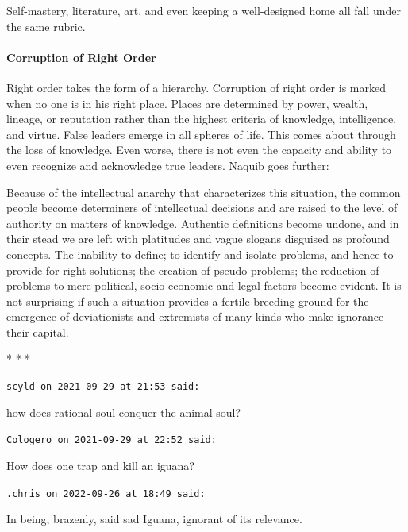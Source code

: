 Self-mastery, literature, art, and even keeping a well-designed home all fall under the same rubric.

\paragraph{Corruption of Right Order}


Right order takes the form of a hierarchy. Corruption of right order is marked when no one is in his right place. Places are determined by power, wealth, lineage, or reputation rather than the highest criteria of knowledge, intelligence, and virtue. False leaders emerge in all spheres of life. This comes about through the loss of knowledge. Even worse, there is not even the capacity and ability to even recognize and acknowledge true leaders. Naquib goes further:

\begin{quotex}
Because of the intellectual anarchy that characterizes this situation, the common people become determiners of intellectual decisions and are raised to the level of authority on matters of knowledge. Authentic definitions become undone, and in their stead we are left with platitudes and vague slogans disguised as profound concepts. The inability to define; to identify and isolate problems, and hence to provide for right solutions; the creation of pseudo-problems; the reduction of problems to mere political, socio-economic and legal factors become evident. It is not surprising if such a situation provides a fertile breeding ground for the emergence of deviationists and extremists of many kinds who make ignorance their capital.
\end{quotex}




\begin{center}* * *\end{center}

\begin{footnotesize}
\begin{sffamily}
\texttt{scyld on 2021-09-29 at 21:53 said:}

how does rational soul conquer the animal soul?

\hfill

\texttt{Cologero on 2021-09-29 at 22:52 said:}

How does one trap and kill an iguana?

\hfill

\texttt{.chris on 2022-09-26 at 18:49 said:}

In being, brazenly, said sad Iguana, ignorant of its relevance.


\hfill

\end{sffamily}
\end{footnotesize}

